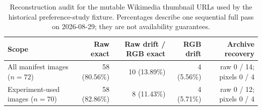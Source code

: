 \begin{table}[t]
\centering
\caption{Reconstruction audit for the mutable Wikimedia thumbnail URLs used by the historical preference-study fixture. Percentages describe one sequential full pass on 2026-08-29; they are not availability guarantees.}
\label{tab:wikimedia-fixture-drift}
\small
\begin{tabular}{lrrrr}
\toprule
Scope & Raw exact & Raw drift / RGB exact & RGB drift & Archive recovery \\
\midrule
All manifest images ($n=72$) & 58 (80.56\%) & 10 (13.89\%) & 4 (5.56\%) & raw 0 / 14; pixels 0 / 4 \\
Experiment-used images ($n=70$) & 58 (82.86\%) & 8 (11.43\%) & 4 (5.71\%) & raw 0 / 12; pixels 0 / 4 \\
\bottomrule
\end{tabular}
\end{table}
